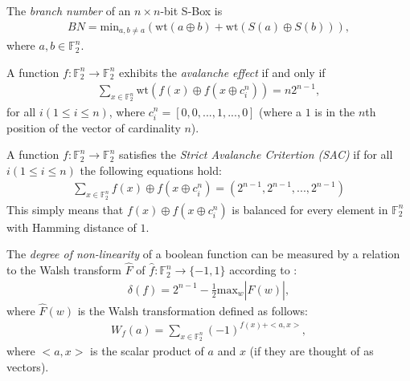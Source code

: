 \documentclass[11pt]{article}
\newcommand{\field}[1]{\mathbb{#1}} %
\begin{document}
\begin{define}
The \emph{branch number} of an $n \times n$-bit S-Box is
\begin{eqnarray*}
BN = \text{min}_{a, b\not=a}(\text{wt}(a \oplus b) + \text{wt}(S(a) \oplus S(b))),
\end{eqnarray*}
where $a, b \in \field{F}_2^n$.
\end{define}

\begin{define}
A function $f : \field{F}_2^n \to \field{F}_2^n$ exhibits the \emph{avalanche effect} if and only if 
\begin{eqnarray*}
\sum_{x \in \field{F}_2^n} \text{wt}(f(x) \oplus f(x \oplus c_{i}^{n})) = n2^{n-1},
\end{eqnarray*}
for all $i (1 \leq i \leq n)$, where $c_{i}^{n} = [0, 0, ..., 1, ..., 0]$ (where a $1$ is in the $n$th position of the vector of cardinality $n$).
\end{define}

\begin{define}
A function $f : \field{F}_2^n \to \field{F}_2^n$ satisfies the \emph{Strict Avalanche Critertion (SAC)} if for all $i (1 \leq i \leq n)$ the following equations hold:
\begin{eqnarray*}
\sum_{x \in \field{F}_2^n} f(x) \oplus f(x \oplus c_i^n) = (2^{n-1}, 2^{n-1}, ..., 2^{n-1})
\end{eqnarray*}
This simply means that $f(x) \oplus f(x \oplus c_i^n)$ is balanced for every element in $\field{F}_2^n$ with Hamming distance of $1$. 
\end{define}

\begin{define}
The \emph{degree of non-linearity} of a boolean function can be measured by a relation to the Walsh transform $\hat{F}$ of $\hat{f} : \field{F}_2^n \to \{-1, 1\}$ according to \cite{Kim90astudy}:
\begin{eqnarray*}
\delta(f)  = 2^{n-1} - \frac{1}{2}\text{max}_w|\hat{F}(w)|,
\end{eqnarray*}
where $\hat{F}(w)$ is the Walsh transformation defined as follows:
\begin{eqnarray*}
W_f(a) = \sum_{x \in \field{F}_2^n} (-1)^{f(x) + <a,x>},
\end{eqnarray*}
where $<a,x>$ is the scalar product of $a$ and $x$ (if they are thought of as vectors).
\end{define}
\end{document}

